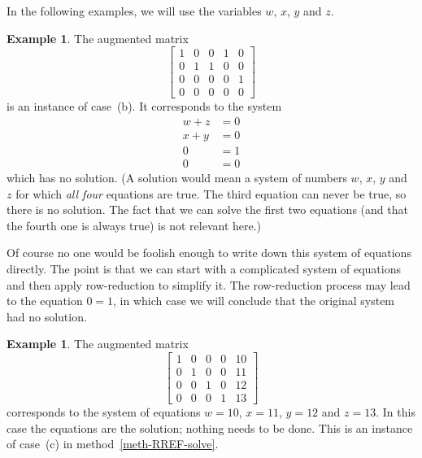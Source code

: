 \documentclass[reqno]{amsart}
\theoremstyle{definition}
\newtheorem{example}[theorem]{Example}
\begin{document}
In the following examples, we will use the variables $w$, $x$, $y$ and
$z$.
\begin{example}\label{eg-rref-solve-i}
 The augmented matrix
 \[ \left[\begin{array}{cccc|c}
     1 & 0 & 0 & 1 & 0 \\
     0 & 1 & 1 & 0 & 0 \\
     0 & 0 & 0 & 0 & 1 \\
     0 & 0 & 0 & 0 & 0
    \end{array}\right]
 \]
 is an instance of case~(b).  It corresponds to the system
 \begin{align*}
  w+z &= 0 \\
  x+y &= 0 \\
    0 &= 1 \\
    0 &= 0
 \end{align*}
 which has no solution.  (A solution would mean a system of numbers
 $w$, $x$, $y$ and $z$ for which \emph{all four} equations are true.  The
 third equation can never be true, so there is no solution.  The fact
 that we can solve the first two equations (and that the fourth one is
 always true) is not relevant here.)

 Of course no one would be foolish enough to write down this system of
 equations directly.  The point is that we can start with a
 complicated system of equations and then apply row-reduction to
 simplify it.  The row-reduction process may lead to the equation
 $0=1$, in which case we will conclude that the original system had no
 solution.
\end{example}

\begin{example}\label{eg-rref-solve-ii}
 The augmented matrix
 \[ \left[\begin{array}{cccc|c}
     1 & 0 & 0 & 0 & 10 \\
     0 & 1 & 0 & 0 & 11 \\
     0 & 0 & 1 & 0 & 12 \\
     0 & 0 & 0 & 1 & 13
    \end{array}\right]
 \]
 corresponds to the system of equations $w=10$, $x=11$, $y=12$ and
 $z=13$.  In this case the equations are the solution; nothing needs
 to be done.  This is an instance of case~(c) in
 method~\ref{meth-RREF-solve}.
\end{example}
\end{document}
